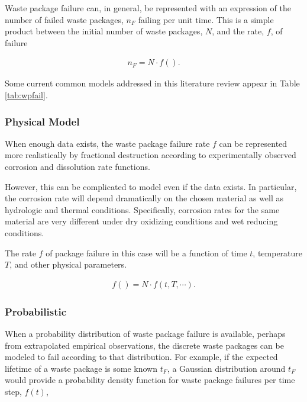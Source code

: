 Waste package failure can, in general, be represented with an expression of the 
number of failed waste packages, $n_F$ failing per unit time. This is a simple 
product between the initial number of waste packages, $N$, and the rate, $f$, of 
failure

\begin{align}
  n_F = N\cdot f().
  \label{rate}
\end{align}

Some current common models addressed in this literature review appear in Table 
\ref{tab:wpfail}.




\subsubsection{Physical Model}

When enough data exists, the waste package failure rate $f$ can
be represented more realistically by fractional destruction according to
experimentally observed corrosion and dissolution rate functions.

However, this can be complicated to model even if the data exists. In
particular, the corrosion rate will depend dramatically on the chosen material 
as well as hydrologic and thermal conditions. Specifically, corrosion rates for 
the same material are very different under dry oxidizing conditions and wet 
reducing conditions. 

The rate $f$ of package  failure in this case will be a function of time $t$, 
temperature $T$, and other physical parameters.

\begin{align}
  f() = N\cdot f(t,T,\cdots).
  \label{rate}
\end{align}

\subsubsection{Probabilistic}

When a probability distribution of waste package failure is available, perhaps 
from extrapolated empirical observations, the discrete waste packages can be 
modeled to fail according to that distribution.  For example, if the expected 
lifetime of a waste package is some known $t_F$, a Gaussian distribution around 
$t_F$ would provide a probability density function for waste package failures 
per time step, $f(t)$,


